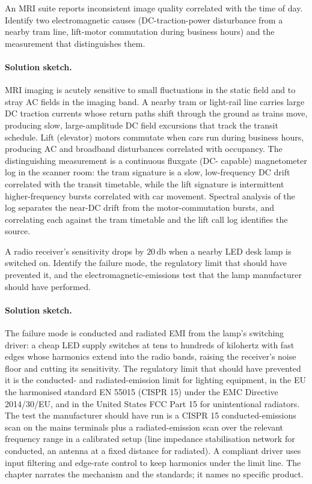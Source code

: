 \begin{exercise}
An MRI suite reports inconsistent image quality correlated with the
time of day. Identify two electromagnetic causes (DC-traction-power
disturbance from a nearby tram line, lift-motor commutation during
business hours) and the measurement that distinguishes them.

\paragraph{Solution sketch.} MRI imaging is acutely sensitive to small
fluctuations in the static field and to stray AC fields in the imaging
band. A nearby tram or light-rail line carries large DC traction
currents whose return paths shift through the ground as trains move,
producing slow, large-amplitude DC field excursions that track the
transit schedule. Lift (elevator) motors commutate when cars run during
business hours, producing AC and broadband disturbances correlated with
occupancy. The distinguishing measurement is a continuous fluxgate (DC-
capable) magnetometer log in the scanner room: the tram signature is a
slow, low-frequency DC drift correlated with the transit timetable,
while the lift signature is intermittent higher-frequency bursts
correlated with car movement. Spectral analysis of the log separates the
near-DC drift from the motor-commutation bursts, and correlating each
against the tram timetable and the lift call log identifies the source.
\end{exercise}

\begin{exercise}
A radio receiver's sensitivity drops by $20\,\si{\decibel}$ when a
nearby LED desk lamp is switched on. Identify the failure mode, the
regulatory limit that should have prevented it, and the
electromagnetic-emissions test that the lamp manufacturer should have
performed.

\paragraph{Solution sketch.} The failure mode is conducted and radiated
EMI from the lamp's switching driver: a cheap LED supply switches at
tens to hundreds of kilohertz with fast edges whose harmonics extend
into the radio bands, raising the receiver's noise floor and cutting its
sensitivity. The regulatory limit that should have prevented it is the
conducted- and radiated-emission limit for lighting equipment, in the
EU the harmonised standard EN 55015 (CISPR 15) under the EMC Directive
2014/30/EU, and in the United States FCC Part 15 for unintentional
radiators. The test the manufacturer should have run is a CISPR 15
conducted-emissions scan on the mains terminals plus a radiated-emission
scan over the relevant frequency range in a calibrated setup (line
impedance stabilisation network for conducted, an antenna at a fixed
distance for radiated). A compliant driver uses input filtering and
edge-rate control to keep harmonics under the limit line. The chapter
narrates the mechanism and the standards; it names no specific product.
\end{exercise}


